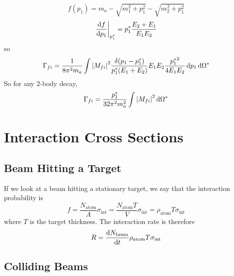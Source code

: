 \documentclass[a4paper,twoside,master.tex]{subfiles}
\begin{document}

\begin{equation}
    f(p_1) = m_a - \sqrt{m_1^2 + p_1^2} - \sqrt{m_2^2 + p_1^2}
\end{equation}
\begin{equation}
    \eval{\dv{f}{p_1}}_{p_1^*} = p_1^* \frac{E_2 + E_1}{E_1 E_2}
\end{equation}
so
\begin{equation}
    \Gamma_{f i} = \frac{1}{8 \pi^2 m_a} \int \abs{M_{f i}}^2 \frac{\delta(p_1 - p_1^*)}{p_1^*(E_1 + E_2)} E_1 E_2 \frac{{p_1^*}^2}{4 E_1 E_2} \dd{p_1} \dd{\Omega^*}
\end{equation}
So for any 2-body decay,
\begin{equation}
    \Gamma_{f i} = \frac{p_1^*}{32 \pi^2 m_a^2} \int \abs{M_{f i}}^2 \dd{\Omega^*}
\end{equation}

\section{Interaction Cross Sections}\label{sec:interaction_cross_sections}

\subsection{Beam Hitting a Target}\label{sub:beam_hitting_a_target}

If we look at a beam hitting a stationary target, we say that the interaction probability is
\begin{equation}
    f = \frac{N_{\text{atom}}}{A} \sigma_{\text{int}} = \frac{N_{\text{atom}} T}{V} \sigma_{\text{int}} = \rho_{\text{atom}} T \sigma_{\text{int}} 
\end{equation}
where $ T $ is the target thickness. The interaction rate is therefore
\begin{equation}
    R = \dv{N_{\text{beam}}}{t} \rho_{\text{atom}} T \sigma_{\text{int}}
\end{equation}

\subsection{Colliding Beams}\label{sub:colliding_beams}
\end{document}
